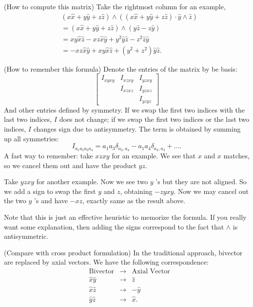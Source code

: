 \begin{remark}
	(How to compute this matrix) 
	Take the rightmost column for an example,
	\begin{align*}
		&(x \hat{x} + y \hat{y}  + z \hat{z} ) \wedge \left(
		(x \hat{x}  + y \hat{y}  + z \hat{z} ) \cdot
		\hat{y}  \wedge \hat{z} \right)\\
		&= (x \hat{x} + y \hat{y}  + z \hat{z} ) \wedge
		(y \hat{z} - z \hat{y} )\\
		&= xy \hat{x} \hat{z}  - xz \hat{x}  \hat{y}  + y^2 \hat{y}  \hat{z}  - z^2 \hat{z}  \hat{y}  \\
		&= -xz \hat{x} \hat{y}  +  xy \hat{x}  \hat{z} + (y^2 + z^2) \hat{y} \hat{z} 
	.\end{align*}
\end{remark}
\begin{remark}
	(How to remember this formula)
	Denote the entries of the matrix by be basis:
\begin{equation*}
\begin{bmatrix}
 I_{x y x y} & I_{x z x y} & I_{y z x y}\\
 & I_{x z x z} & I_{y z x z}\\
 & & I_{y z y z}
\end{bmatrix}
\end{equation*}
And other entries defined by symmetry. If we swap the first two indices with the last two indices, $I$ does not change; if we swap the first two indices or the last two indices, $I$ changes sign due to antisymmetry. The term is obtained by summing up all symmetries:
\[
	I_{a_1 a_2 a_3 a_4 } = a_1 a_3 \delta_{a_2,a_4} - a_1 a_4 \delta_{a_2,a_3}+ \ldots
.\] 
A fast way to remember: take $xzxy$ for an example. We see that $x$ and $x$ matches, so we cancel them out and have the product $y z$. 

Take $y z x y$ for another example. Now we see two $y$ 's but they are not aligned. So we add a sign to swap the first $y$ and $z$, obtaining $- z y x y$. Now we may cancel out the two $y$ 's and have $- x z$, exactly same as the result above.

Note that this is just an effective heuristic to memorize the formula. If you really want some explanation, then adding the signs correspond to the fact that $\wedge$ is antisymmetric.
\end{remark}

\begin{remark}
	(Compare with cross product formulation) In the traditional approach, bivector are replaced by axial vectors. We have the following correspondence:
\begin{align*}
	&\text{Bivector} &\to  &\text{Axial Vector}\\
	&\hat{x} \hat{y}  &\to  &\hat{z} \\
	&\hat{x} \hat{z}  &\to &-\hat{y} \\
	&\hat{y}  \hat{z}  &\to  &\hat{x} 
.\end{align*}
	
\end{remark}

